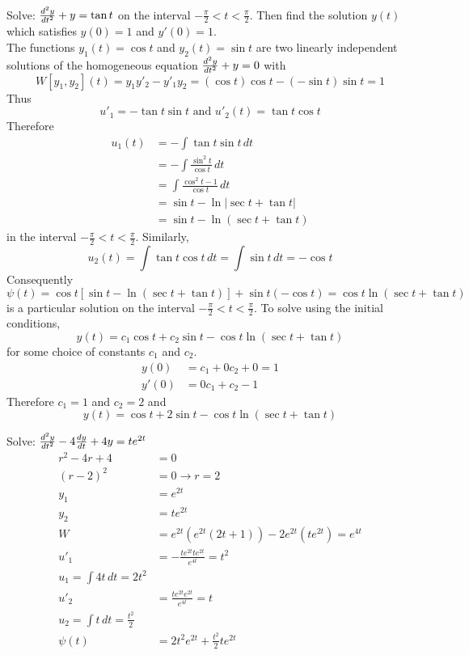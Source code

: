\documentclass[12pt]{article}
\begin{document}
\begin{example} Solve: $\frac{d^2y}{dt^2} + y = \tan t$ on the interval $-\frac{\pi}{2} < t < \frac{\pi}{2}$. Then find the solution $y(t)$ which satisfies $y(0) = 1$ and $y'(0) = 1$. \\ 
The functions $y_1(t) = \cos t$ and $y_2(t) = \sin t$ are two linearly independent solutions of the homogeneous equation $\frac{d^2y}{dt^2} + y = 0$ with $$W[y_1, y_2](t) = y_1y'_2 - y'_1y_2 = (\cos t)\cos t - (-\sin t)\sin t = 1$$ Thus $$u'_1 = -\tan t\sin t \text{ and } u'_2(t) = \tan t\cos t$$ 
Therefore $$\begin{aligned} u_1(t) &= -\int \tan t \sin t \, dt \\ &= -\int \frac{\sin^2 t}{\cos t} \, dt \\ &= \int \frac{\cos^2 t - 1}{\cos t} \, dt \\ &= \sin t - \ln | \sec t + \tan t| \\ &= \sin t - \ln(\sec t + \tan t) \end{aligned} $$ in the interval $-\frac{\pi}{2} < t < \frac{\pi}{2} $. Similarly, $$u_2(t) = \int \tan t \cos t \, dt = \int \sin t \, dt = -\cos t $$ 
Consequently $$\psi(t) = \cos t[\sin t - \ln(\sec t + \tan t)] + \sin t(-\cos t) = \cos t \ln(\sec t + \tan t) $$ is a particular solution on the interval $-\frac{\pi}{2} < t < \frac{\pi}{2}$. To solve using the initial conditions, $$y(t) = c_1\cos t + c_2\sin t - \cos t\ln(\sec t + \tan t) $$ for some choice of constants $c_1$ and $c_2$. $$\begin{aligned} y(0) &= c_1 + 0c_2 + 0 = 1 \\ y'(0) &= 0c_1 + c_2 - 1 \end{aligned} $$ Therefore $c_1 = 1$ and $c_2 = 2$ and $$y(t) = \cos t + 2\sin t - \cos t\ln(\sec t + \tan t)$$ \end{example} 

\begin{example} Solve: $\frac{d^2y}{dt^2} - 4\frac{dy}{dt}+ 4y = te^{2t}$$$\begin{aligned} 
r^2 - 4r + 4 &= 0 \\ (r - 2)^2 &= 0 \to r = 2 \\ 
y_1 &= e^{2t} \\ y_2 &= te^{2t} \\ 
W &= e^{2t}(e^{2t}(2t + 1)) - 2e^{2t}(te^{2t}) = e^{4t} \\ 
u'_1 &= -\frac{te^{2t}te^{2t}}{e^{4t}} = t^2 \\
u_1 = \int 4t \, dt = 2t^2 \\ 
u'_2 &= \frac{te^{2t}e^{2t}}{e^{4t}} = t \\
u_2 = \int t \, dt = \frac{t^2}{2} \\
\psi(t) &= 2t^2e^{2t} + \frac{t^2}{2}te^{2t} 
\end{aligned} $$ \end{example} 
\end{document}
